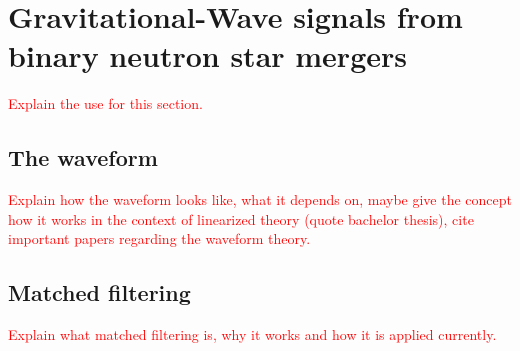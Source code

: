 \section{Gravitational-Wave signals from binary neutron star mergers}
\textcolor{red}{Explain the use for this section.}
\subsection{The waveform}
\textcolor{red}{Explain how the waveform looks like, what it depends on, maybe give the concept how it works in the context of linearized theory (quote bachelor thesis), cite important papers regarding the waveform theory.}
\subsection{Matched filtering}
\textcolor{red}{Explain what matched filtering is, why it works and how it is applied currently.}